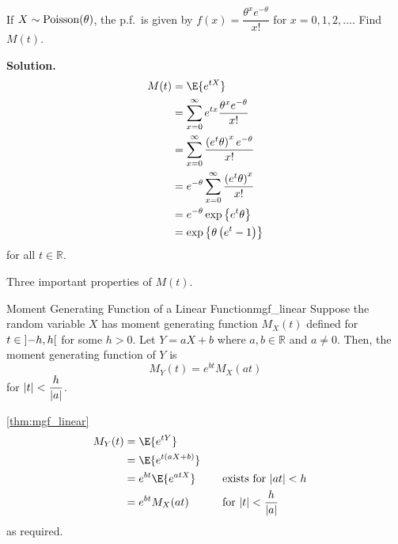 \begin{Example}{}{}
    If $ X \sim \operatorname{Poisson}(\theta) $, the p.f.\ is given by
    $ f(x)=\dfrac{\theta^x e^{-\theta}}{x!} $
    for $ x=0,1,2,\ldots $. Find $ M(t) $.

    \textbf{Solution.}
    \begin{align*}
        M(t)
         & =\E{e^{tX}}                                                                    \\
         & =\sum\limits_{x=0}^{\infty} e^{tx} \frac{\theta^x e^{-\theta}}{x!}             \\
         & =\sum\limits_{x=0}^{\infty} \frac{\left( e^t \theta \right)^x e^{-\theta}}{x!} \\
         & =e^{-\theta}\sum\limits_{x=0}^{\infty} \frac{\left( e^t \theta \right)^x}{x!}  \\
         & =e^{-\theta} \exp\left\{e^t \theta\right\}                                     \\
         & =\exp\left\{\theta\left( e^t-1 \right)\right\}
    \end{align*}
    for all $ t\in\mathbb{R} $.
\end{Example}
Three important properties of $ M(t) $.

\begin{Theorem}{Moment Generating Function of a Linear Function}{mgf_linear}
    Suppose the random variable $ X $ has moment generating function
    $ M_X(t) $ defined for $ t\in\interval[open]{-h}{h} $ for some $ h>0 $.
    Let $ Y=aX+b $ where $ a,b\in\mathbb{R} $ and $ a\neq 0 $. Then,
    the moment generating function of $ Y $ is
    \[ M_Y(t)=e^{bt}M_X(at) \]
    for $ \lvert t\rvert<\dfrac{h}{\lvert a\rvert} $.
\end{Theorem}

\begin{Proof}{\ref{thm:mgf_linear}}{}
    \begin{align*}
        M_Y(t)
         & =\E{e^{tY}}                                                       \\
         & =\E{e^{t(aX+b)}}                                                  \\
         & =e^{bt}\E{e^{atX}} & \quad & \text{exists for }\abs{at}<h         \\
         & =e^{bt}M_X(at)     &       & \text{for }\abs{t}<\frac{h}{\abs{a}}
    \end{align*}
    as required.
\end{Proof}

